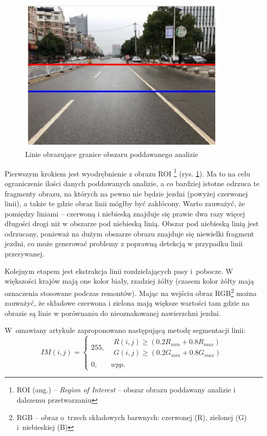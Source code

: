 \begin{figure}
  \centering
  \includegraphics[width=10cm]{img/roi.png}
  \caption{Linie obrazujące granice obszaru poddawanego analizie\cite{T3}}
  \label{fig:roi} 
\end{figure}


Pierwszym krokiem jest wyodrębnienie z obrazu ROI \footnote{ROI (ang.) -- \textit{Region of Interest} -- obszar obrazu poddawany analizie i dalszemu przetwarzaniu} (rys. \ref{fig:roi}). 
Ma to na celu ograniczenie ilości danych poddawanych analizie, a co bardziej istotne odrzuca te fragmenty obrazu, na których na pewno nie będzie jezdni (powyżej czerwonej linii), a także te gdzie obraz linii mógłby być zakłócony. 
Warto zauważyć, że pomiędzy liniami -- czerwoną i niebieską znajduje się prawie dwa razy więcej długości drogi niż w obszarze pod niebieską linią. Obszar pod niebieską linią jest odrzucany, ponieważ na dużym obszarze obrazu znajduje się niewielki fragment jezdni, co może generować problemy z poprawną detekcją w przypadku linii przerywanej.

Kolejnym etapem jest ekstrakcja linii rozdzielających pasy i~pobocze. 
W większości krajów mają one kolor biały, rzadziej żółty (czasem kolor żółty mają oznaczenia stosowane podczas remontów). 
Mając na wejściu obraz RGB\footnote{RGB -- obraz o~trzech składowych barwnych: czerwonej (R), zielonej (G) i~niebieskiej (B)} można zauważyć, że składowe czerwona i zielona mają większe wartości tam gdzie na obrazie są linie w porównaniu do nieoznakowanej nawierzchni jezdni. 

W~omawiany artykule zaproponowano następującą metodę segmentacji linii:
\begin{equation}
\label{eq:IMij}
IM(i,j)=\left\{\begin{matrix}
255, & \begin{matrix}
R(i,j)\geq (0.2R_{min}+0.8R_{max})\\ 
G(i,j)\geq (0.2G_{min}+0.8G_{max})
\end{matrix}\\ 
0, & wpp.
\end{matrix}\right.
\end{equation}

